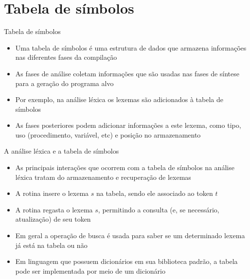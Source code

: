 \section{Tabela de símbolos}

\begin{frame}[fragile]{Tabela de símbolos}

    \begin{itemize}
        \item Uma tabela de símbolos é uma estrutura de dados que armazena informações nas diferentes fases da compilação

        \item As fases de análise coletam informações que são usadas nas fases de síntese para a geração do programa alvo

        \item Por exemplo, na análise léxica os lexemas são adicionados à tabela de símbolos

        \item As fases posteriores podem adicionar informações a este lexema, como tipo, uso (procedimento, variável, etc) e posição no armazenamento
    \end{itemize}

\end{frame}

\begin{frame}[fragile]{A análise léxica e a tabela de símbolos}

    \begin{itemize}
        \item As principais interações que ocorrem com a tabela de símbolos na análise léxica tratam do armazenamento e recuperação de lexemas

        \item A rotina  insere o lexema $s$ na tabela, sendo ele associado ao token $t$

        \item A rotina  regasta o lexema $s$, permitindo a consulta (e, se necessário, atualização) de seu token

        \item Em geral a operação de busca é usada para saber se um determinado lexema já está na tabela ou não

        \item Em linguagem que possuem dicionários em sua biblioteca padrão, a tabela pode ser implementada por meio de um dicionário
    \end{itemize}

\end{frame}

